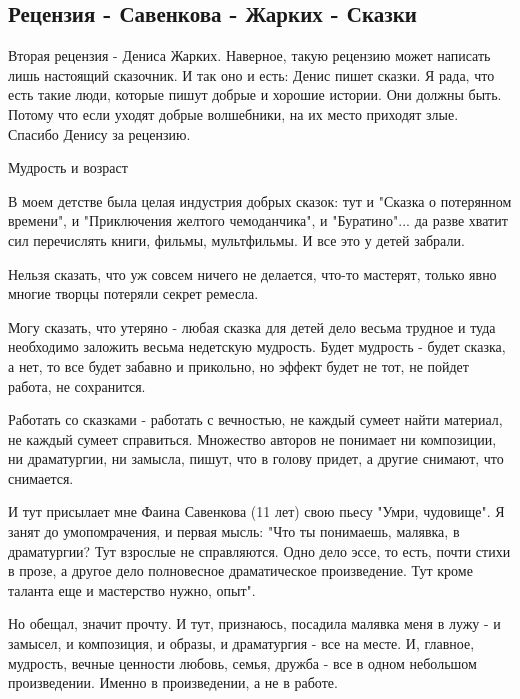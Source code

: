  
 
 
 
 

\subsection{Рецензия - Савенкова - Жарких - Сказки}
\label{sec:21_07_2020.fb.zharkih_denis.1.savenkova_skazki}

Вторая рецензия  - Дениса Жарких. Наверное, такую рецензию может написать лишь
настоящий сказочник. И так оно и есть: Денис пишет сказки. Я рада, что есть
такие люди, которые пишут добрые и хорошие истории. Они должны  быть. Потому
что если уходят добрые волшебники, на их место приходят злые. Спасибо Денису за
рецензию.

Мудрость и возраст

В моем детстве была целая индустрия добрых сказок: тут и "Сказка о потерянном
времени", и "Приключения желтого чемоданчика", и "Буратино"... да разве хватит
сил перечислять книги, фильмы, мультфильмы. И все это у детей забрали. 

Нельзя сказать, что уж совсем ничего не делается, что-то мастерят, только явно многие творцы потеряли секрет ремесла. 

Могу сказать, что утеряно - любая сказка для детей дело весьма трудное и туда
необходимо заложить весьма недетскую мудрость. Будет мудрость - будет сказка, а
нет, то все будет забавно и прикольно, но эффект будет не тот, не пойдет
работа, не сохранится. 

Работать со сказками - работать с вечностью, не каждый сумеет найти материал,
не каждый сумеет справиться. Множество авторов не понимает ни композиции, ни
драматургии, ни замысла, пишут, что в голову придет, а другие снимают, что
снимается. 

И тут присылает мне Фаина Савенкова (11 лет) свою пьесу "Умри, чудовище". Я
занят до умопомрачения, и первая мысль: "Что ты понимаешь, малявка, в
драматургии? Тут взрослые не справляются. Одно дело эссе, то есть, почти стихи
в прозе, а другое дело полновесное драматическое произведение. Тут кроме
таланта еще и мастерство нужно, опыт". 

Но обещал, значит прочту. И тут, признаюсь, посадила малявка меня в лужу - и
замысел, и композиция, и образы, и драматургия - все на месте. И, главное,
мудрость, вечные ценности любовь, семья, дружба - все в одном небольшом
произведении. Именно в произведении, а не в работе. 

